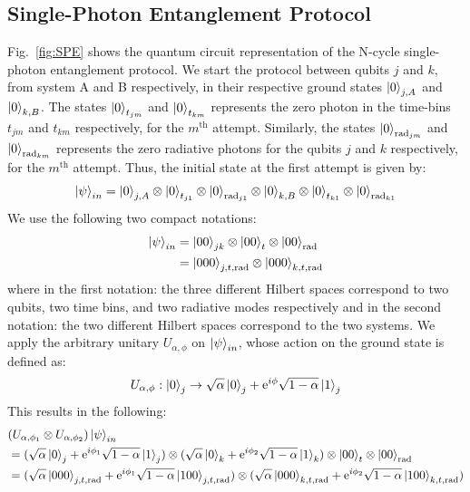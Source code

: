 \subsection{Single-Photon Entanglement Protocol}
Fig.~\ref{fig:SPE} shows the quantum circuit representation \cite{Nielsen_Chuang_2010} of the N-cycle single-photon entanglement protocol. We start the protocol between qubits $j$ and $k$, from system A and B respectively, in their respective ground states $\ket{0}_{j,A}$ and $\ket{0}_{k,B}$. The states $\ket{0}_{t_{jm}}$ and $\ket{0}_{t_{km}}$ represents the zero photon in the time-bins $t_{jm}$ and $t_{km}$ respectively, for the $m^{\text{th}}$ attempt. Similarly, the states $\ket{0}_{\text{rad}_{jm}}$ and $\ket{0}_{\text{rad}_{km}}$ represents the zero radiative photons for the qubits $j$ and $k$ respectively, for the $m^{\text{th}}$ attempt. Thus, the initial state at the first attempt is given by:
\begin{equation}
    \ket{\psi}_{in} = \ket{0}_{j,A}\otimes\ket{0}_{t_{j1}}\otimes\ket{0}_{\text{rad}_{j1}}\otimes\ket{0}_{k,B}\otimes\ket{0}_{t_{k1}}\otimes\ket{0}_{\text{rad}_{k1}}
\end{equation}
We use the following two compact notations:
\begin{subequations}
\begin{align}
    \ket{\psi}_{in} &= \ket{00}_{jk}\otimes\ket{00}_{t}\otimes \ket{00}_{\text{rad}}\\
    &= \ket{000}_{j,t,\text{rad}}\otimes\ket{000}_{k,t,\text{rad}}
\end{align}    
\end{subequations}
where in the first notation: the three different Hilbert spaces correspond to two qubits, two time bins, and two radiative modes respectively and in the second notation: the two different Hilbert spaces correspond to the two systems. We apply the arbitrary unitary $U_{\alpha,\phi}$ on $\ket{\psi}_{in}$, whose action on the ground state is defined as:
\begin{equation}
    U_{\alpha,\phi}:\ket{0}_{j}\to \sqrt{\alpha}\ket{0}_{j} + \text{e}^{i\phi}\sqrt{1-\alpha}\ket{1}_{j}
\end{equation}
This results in the following:
\begin{subequations}
\begin{align}
     &(U_{\alpha,\phi_{1}}\otimes U_{\alpha,\phi_{2}})\ket{\psi}_{in} \nonumber \\
     &= (\sqrt{\alpha}\ket{0}_{j} + \text{e}^{i\phi_{1}}\sqrt{1-\alpha}\ket{1}_{j})\otimes(\sqrt{\alpha}\ket{0}_{k} + \text{e}^{i\phi_{2}}\sqrt{1-\alpha}\ket{1}_{k})\otimes\ket{00}_{t}\otimes\ket{00}_{\text{rad}}\\
     &= (\sqrt{\alpha}\ket{000}_{j,t,\text{rad}} + \text{e}^{i\phi_{1}}\sqrt{1-\alpha}\ket{100}_{j,t,\text{rad}})\otimes (\sqrt{\alpha}\ket{000}_{k,t,\text{rad}} + \text{e}^{i\phi_{2}}\sqrt{1-\alpha}\ket{100}_{k,t,\text{rad}})
\end{align}
\end{subequations}
